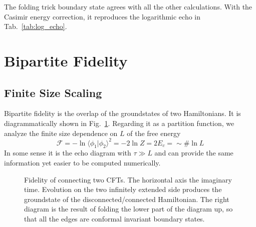 \documentclass{article}
\begin{document}
The folding trick boundary state agrees with all the other calculations. With the Casimir energy correction, it reproduces the logarithmic echo in Tab.~\ref{tab:log_echo}. 



\section{Bipartite Fidelity}
\subsection{Finite Size Scaling}

Bipartite fidelity is the overlap of the groundstates of two Hamiltonians. It is diagrammatically shown in Fig.~\ref{fig:fidel}. Regarding it as a partition function, we analyze the finite size dependence on $L$ of the free energy
\begin{equation}
\mathcal{F} = - \ln \langle \phi_1 |\phi_2 \rangle^2 = - 2 \ln Z   = 2 E_c = \sim \# \ln L 
\end{equation}
In some sense it is the echo diagram with $\tau \gg L$ and can provide the same information yet easier to be computed numerically. 

\begin{figure}[h]
\centering
{}
\caption{Fidelity of connecting two CFTs. The horizontal axis the imaginary time. Evolution on the two infinitely extended side produces the groundstate of the disconnected/connected Hamiltonian. The right diagram is the result of folding the lower part of the diagram up, so that all the edges are conformal invariant boundary states.}
\label{fig:fidel}
\end{figure}
\end{document}

